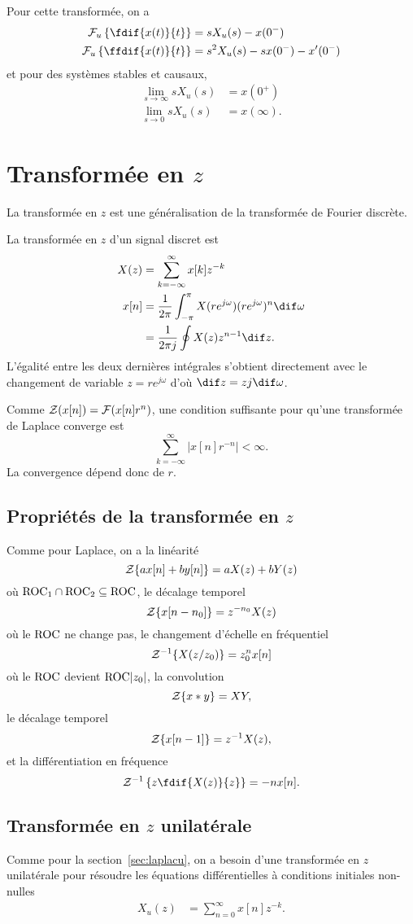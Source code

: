 Pour cette transformée, on a
\begin{align*}
  \laplacu\left\{\fdif{x(t)}{t}\right\} & =
  sX_u(s) - x(0^-)\\
  \laplacu\left\{\ffdif{x(t)}{t}\right\} & =
  s^2X_u(s) - sx(0^-) - x'(0^-)
\end{align*}
et pour des systèmes stables et causaux,
\begin{align*}
  \lim_{s\to\infty} sX_u(s) & = x(0^+)\\
  \lim_{s\to 0} sX_u(s) & = x(\infty).
\end{align*}

\section{Transformée en $z$}
La transformée en $z$ est une généralisation de la transformée de Fourier
discrète.

La transformée en $z$ d'un signal discret est
\begin{align*}
  X(z) & = \sum_{k=-\infty}^{\infty} x[k]z^{-k}\\
  x[n] & =
  \frac{1}{2\pi}\int_{-\pi}^{\pi} X(re^{j\omega})(re^{j\omega})^n\dif \omega\\
  & = \frac{1}{2\pi j}\oint X(z) z^{n-1} \dif z.
\end{align*}
L'égalité entre les deux dernières intégrales
s'obtient directement avec le changement
de variable $z = re^{j\omega}$ d'où $\dif z = zj\dif \omega$.

Comme $\mathcal{Z}(x[n]) = \mathcal{F}(x[n]r^n)$,
une condition suffisante pour qu'une transformée de Laplace converge est
\[ \sum_{k=-\infty}^\infty|x[n]r^{-n}| < \infty. \]
La convergence dépend donc de $r$.

\subsection{Propriétés de la transformée en $z$}
Comme pour Laplace, on a la linéarité
\[ \mathcal{Z}\{ax[n]+by[n]\} = aX(z) + bY(z) \]
où $\mathrm{ROC}_1 \cap \mathrm{ROC}_2 \subseteq \mathrm{ROC}$,
le décalage temporel
\[ \mathcal{Z}\{x[n-n_0]\} = z^{-n_0}X(z) \]
où le $\mathrm{ROC}$ ne change pas,
le changement d'échelle en fréquentiel
\[ \mathcal{Z}^{-1}\{X(z/z_0)\} = z_0^nx[n] \]
où le $\mathrm{ROC}$ devient $\mathrm{ROC} |z_0|$,
la convolution
\[ \mathcal{Z}\{x*y\} = XY, \]
le décalage temporel
\[ \mathcal{Z}\{x[n-1]\} = z^{-1}X(z), \]
et la différentiation en fréquence
\[ \transfz^{-1}\left\{z\fdif{X(z)}{z}\right\} = -nx[n]. \]

\subsection{Transformée en $z$ unilatérale}
Comme pour la section~\ref{sec:laplacu}, on a besoin
d'une transformée en $z$ unilatérale pour résoudre les équations
différentielles à conditions initiales non-nulles
\begin{align*}
  X_u(z) & = \sum_{n=0}^\infty x[n] z^{-k}.
\end{align*}

